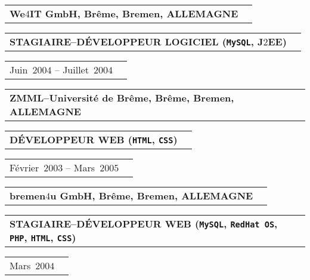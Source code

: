 \documentclass[9pt,a4paper]{article} %
\makeatletter
\newcommand{\headerrow}[2]
{\begin{tabular*}{\linewidth}{l@{\extracolsep{\fill}}r}
	#1 &
	#2 \\
\end{tabular*}}
\newcommand{\css}{\texttt{CSS}\xspace}
\newcommand{\php}{\texttt{PHP}\xspace}
\newcommand{\mysql}{\texttt{MySQL}\xspace}
\newcommand{\redhat}{\texttt{RedHat~OS}\xspace}
\newcommand{\html}{\texttt{HTML}\xspace}
\newcommand{\jtwoee}{J$2$EE\xspace}
\newcommand{\cvitemdate}[2]{#1~$#2$\xspace}
\newcommand{\cvitempositionheld}[1]{\textbf{#1}\xspace}
\makeatother
\begin{document}
\headerrow
	{\textbf{We$4$IT GmbH, Brême, Bremen, ALLEMAGNE}}	
	{}
\headerrow
	{\cvitempositionheld{STAGIAIRE--DÉVELOPPEUR LOGICIEL (\mysql, \jtwoee)}}
	{}
\headerrow
	{\cvitemdate{Juin}{2004} -- \cvitemdate{Juillet}{2004}}	
	{}
	
\vspace{0.3em}

\headerrow
	{\textbf{ZMML--Université de Brême, Brême, Bremen, ALLEMAGNE}}	
	{}
\headerrow
	{\cvitempositionheld{DÉVELOPPEUR WEB (\html, \css)}}
	{}
\headerrow
	{\cvitemdate{Février}{2003} -- \cvitemdate{Mars}{2005}}	
	{}

\vspace{0.3em}

\headerrow
	{\textbf{bremen$4$u GmbH, Brême, Bremen, ALLEMAGNE}}	
	{}
\headerrow
	{\cvitempositionheld{STAGIAIRE--DÉVELOPPEUR WEB (\mysql, \redhat, \php, \html, \css)}}
	{}
\headerrow
	{\cvitemdate{Mars}{2004}}	
	{}	

\vspace{2em}
	
\end{document}
